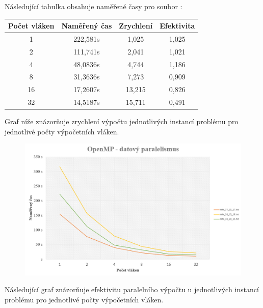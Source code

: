 \documentclass{article}
\begin{document}
\noindent Následující tabulka obsahuje naměřené časy pro soubor :
\begin{table}[H]\centering
    \begin{tabular}{|c|c|c|c|}
        \hline \textbf{Počet vláken} & \textbf{Naměřený čas} & \textbf{Zrychlení} & \textbf{Efektivita} \\ \hline \hline
        1 &	222,581s & 1,025 & 1,025 \\ \hline
        2 &	111,741s & 2,041 & 1,021 \\ \hline
        4 &	48,0836s & 4,744 & 1,186 \\ \hline
        8 &	31,3636s & 7,273 & 0,909 \\ \hline
        16 & 17,2607s & 13,215 & 0,826 \\ \hline
        32 & 14,5187s & 15,711 & 0,491 \\ \hline
    \end{tabular}
\end{table} 

\noindent Graf níže znázorňuje zrychlení výpočtu jednotlivých instancí problému pro jednotlivé počty výpočetních vláken.

\begin{figure}[H]
    \centering
    \includegraphics[width=\textwidth]{OpenMPdataGraf.png}
\end{figure}

\noindent Následující graf znázorňuje efektivitu paralelního výpočtu u jednotlivých instancí problému pro jednotlivé počty výpočetních vláken.
\end{document}
